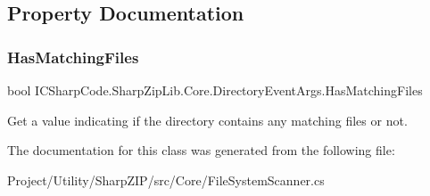 \subsection{Property Documentation}
\mbox{\label{class_i_c_sharp_code_1_1_sharp_zip_lib_1_1_core_1_1_directory_event_args_ad501f1a7b95ca5116a14143266345d59}} 
\subsubsection{\texorpdfstring{Has\+Matching\+Files}{HasMatchingFiles}}
{\footnotesize\ttfamily bool I\+C\+Sharp\+Code.\+Sharp\+Zip\+Lib.\+Core.\+Directory\+Event\+Args.\+Has\+Matching\+Files\hspace{0.3cm}{\ttfamily [get]}}



Get a value indicating if the directory contains any matching files or not. 



The documentation for this class was generated from the following file\+:\begin{DoxyCompactItemize}
\item 
Project/\+Utility/\+Sharp\+Z\+I\+P/src/\+Core/File\+System\+Scanner.\+cs\end{DoxyCompactItemize}
